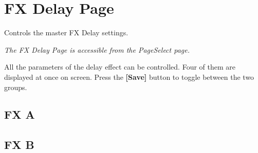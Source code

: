 \chapter{FX Delay Page}


Controls the master FX Delay settings.


\textit{The FX Delay Page is accessible from the PageSelect page.}

All the parameters of the delay effect can be controlled. Four of them are displayed at once on screen. Press the \textbf{[Save]} button to toggle between the two groups.

\section{FX A}

\newpage
\section{FX B}
